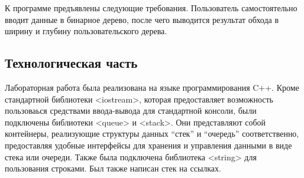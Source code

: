 \documentclass[12pt, a4paper]{article}
\begin{document}
К программе предъявлены следующие требования. Пользователь самостоятельно вводит данные в бинарное дерево, после чего выводится результат обхода в ширину и глубину пользовательского дерева.

\newpage
\begin{center}
    \section{Технологическая часть}
\end{center}

Лабораторная работа была реализована на языке программирования C++. Кроме стандартной библиотеки <iostream>, которая предоставляет возможность пользоваься средствами ввода-вывода для стандартной консоли, были подключены библиотеки <queue> и <stack>. Они представляют собой контейнеры, реализующие структуры данных ``стек'' и ``очередь'' соответственно, предоставляя удобные интерфейсы для хранения и управления данными в виде стека или очереди. Также была подключена библиотека <string> для пользования строками. Был также написан стек на ссылках.
\end{document}
